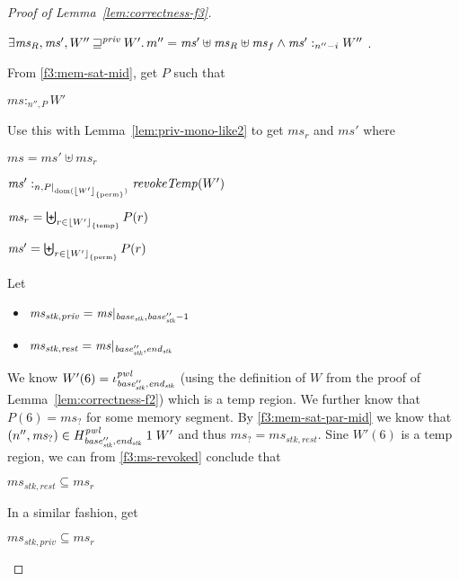 \documentclass[a4paper]{article}
\DeclarePairedDelimiter\floor{\lfloor}{\rfloor}
\DeclareMathOperator{\dom}{dom}
\newcommand{\var}[1]{\mathit{#1}}
\newcommand{\hs}{\var{ms}}
\newcommand{\ms}{\hs}
\newcommand{\start}{\var{base}}
\newcommand{\addrend}{\var{end}}
\newcommand{\heap}{\var{mem}}
\newcommand{\stk}{\var{stk}}
\newcommand{\pwl}{\var{pwl}}
\newcommand{\plainfun}[2]{
  \ifthenelse{\equal{#2}{}}
  {\mathit{#1}}
  {\mathit{#1}(#2)}
}
\newcommand{\revokeTemp}[1]{\plainfun{revokeTemp}{#1}}
\newcommand{\erase}[2]{\floor*{#1}_{\{#2\}}}
\newcommand{\futurestr}{\mathbin{\sqsupseteq}^{\var{priv}}}
\newcommand{\heapSat}[3][\heap]{#1 :_{#2} #3}
\newcommand{\memSatPar}[4][n]{\heapSat[#2]{#1 , #4}{#3}}
\newcommand{\npair}[2][n]{\left(#1,#2 \right)}
\newcommand{\plainview}[1]{\mathrm{#1}}
\newcommand{\perma}{\plainview{perm}}
\newcommand{\temp}{\plainview{temp}}
\begin{document}
\begin{proof}[Proof of Lemma~\ref{lem:correctness-f3}]
\begin{enumproof}[start=3]
\begin{enumproof}[start=3]
      \begin{enumproof}
      \item $\exists \ms_R,\ms', W'' \futurestr W' \ldotp m'' = \ms' \uplus \ms_R \uplus \ms_f \land \heapSat[\ms']{n''-i}{W''}$ \label{f3:proof-burden}.
      \end{enumproof}
      From \ref{f3:mem-sat-mid}, get $P$ such that 
      \begin{enumproof}[resume]
      \item $\memSatPar[n'']{\ms}{W'}{P}$ \label{f3:mem-sat-par-mid}
      \end{enumproof}
      Use this with Lemma~\ref{lem:priv-mono-like2} to get $\ms_r$ and $\ms'$ where
      \begin{enumproof}[resume]
      \item $\ms = \ms' \uplus \ms_r$
      \item $\memSatPar{\ms'}{\revokeTemp{W'}}{P|_{\dom(\erase{W'}{\perma})}}$ \label{f3:perm-mem-sat}
      \item $\ms_r = \biguplus_{r \in \erase{W'}{\temp}} P(r)$ \label{f3:ms-revoked}
      \item $\ms' = \biguplus_{r \in \erase{W'}{\perma}} P(r)$
      \end{enumproof}
      Let
      \begin{itemize}
      \item $\ms_{\stk,\var{priv}} = \ms |_{\start_\stk,\base_\stk''-1}$
      \item $\ms_{\stk,\var{rest}} = \ms |_{\base_\stk'',\addrend_\stk}$
      \end{itemize}
      We know $W'(6)=\iota^\pwl_{\base_\stk'',\addrend_\stk}$ (using the definition of $W$ from the proof of Lemma~\ref{lem:correctness-f2}) which is a $\temp$ region. We further know that $P(6) = \ms_{\var{?}}$ for some memory segment. By \ref{f3:mem-sat-par-mid} we know that $\npair[n'']{\ms_?} \in H^\pwl_{\base_\stk'',\addrend_\stk} \; 1 \; W'$ and thus $\ms_? = \ms_{\stk,\var{rest}}$. Sine $W'(6)$ is a $\temp$ region, we can from \ref{f3:ms-revoked} conclude that 
      \begin{enumproof}[resume]
      \item $\ms_{\stk,\var{rest}} \subseteq \ms_r$
      \end{enumproof}
      In a similar fashion, get
      \begin{enumproof}[resume]
      \item $\ms_{\stk,\var{priv}} \subseteq \ms_r$
      \end{enumproof}


\end{enumproof}
\end{enumproof}
\end{proof}
\end{document}
